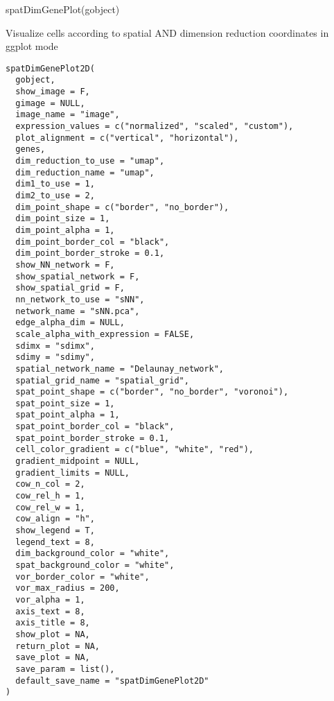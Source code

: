 \documentclass[a4paper]{book}
\begin{document}
%
\begin{Examples}
\begin{ExampleCode}
    spatDimGenePlot(gobject)
\end{ExampleCode}
\end{Examples}
%
\begin{Description}\relax
Visualize cells according to spatial AND dimension reduction coordinates in ggplot mode
\end{Description}
%
\begin{Usage}
\begin{verbatim}
spatDimGenePlot2D(
  gobject,
  show_image = F,
  gimage = NULL,
  image_name = "image",
  expression_values = c("normalized", "scaled", "custom"),
  plot_alignment = c("vertical", "horizontal"),
  genes,
  dim_reduction_to_use = "umap",
  dim_reduction_name = "umap",
  dim1_to_use = 1,
  dim2_to_use = 2,
  dim_point_shape = c("border", "no_border"),
  dim_point_size = 1,
  dim_point_alpha = 1,
  dim_point_border_col = "black",
  dim_point_border_stroke = 0.1,
  show_NN_network = F,
  show_spatial_network = F,
  show_spatial_grid = F,
  nn_network_to_use = "sNN",
  network_name = "sNN.pca",
  edge_alpha_dim = NULL,
  scale_alpha_with_expression = FALSE,
  sdimx = "sdimx",
  sdimy = "sdimy",
  spatial_network_name = "Delaunay_network",
  spatial_grid_name = "spatial_grid",
  spat_point_shape = c("border", "no_border", "voronoi"),
  spat_point_size = 1,
  spat_point_alpha = 1,
  spat_point_border_col = "black",
  spat_point_border_stroke = 0.1,
  cell_color_gradient = c("blue", "white", "red"),
  gradient_midpoint = NULL,
  gradient_limits = NULL,
  cow_n_col = 2,
  cow_rel_h = 1,
  cow_rel_w = 1,
  cow_align = "h",
  show_legend = T,
  legend_text = 8,
  dim_background_color = "white",
  spat_background_color = "white",
  vor_border_color = "white",
  vor_max_radius = 200,
  vor_alpha = 1,
  axis_text = 8,
  axis_title = 8,
  show_plot = NA,
  return_plot = NA,
  save_plot = NA,
  save_param = list(),
  default_save_name = "spatDimGenePlot2D"
)
\end{verbatim}
\end{Usage}
%
\end{document}
